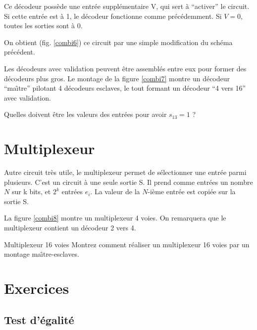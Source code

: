 Ce d\'ecodeur poss\`ede une entr\'ee suppl\'ementaire V, qui sert
à ``activer'' le circuit.  Si cette entr\'ee
est \`a 1, le d\'ecodeur fonctionne comme pr\'ec\'edemment. Si $V=0$,
toutes les sorties sont \`a 0.

On obtient (fig. \ref{combi6}) ce circuit par une simple modification du 
sch\'ema pr\'ec\'edent.



\begin{remarque}{} Les d\'ecodeurs avec validation peuvent \^etre
assembl\'es entre eux pour former des d\'ecodeurs plus gros. Le montage
de la figure \ref{combi7} montre un d\'ecodeur ``ma\^{\i}tre'' pilotant
4 d\'ecodeurs esclaves, le tout formant un d\'ecodeur ``4 vers 16''
avec validation.
\end{remarque}


\begin{exercice}{} Quelles doivent être les valeurs des entrées pour
avoir $s_{13} = 1$ ?
\end{exercice}

\section{Multiplexeur}

Autre circuit très utile, le multiplexeur permet de s\'electionner une
entr\'ee parmi plusieurs. C'est un circuit \`a une seule sortie S.  Il
prend comme entr\'ees un nombre $N$ sur k bits, et $2^k$ entr\'ees
$e_i$. La valeur de la $N$-i\`eme entr\'ee est copi\'ee sur la sortie
S.


La figure \ref{combi8} montre un multiplexeur 4 voies. On remarquera
que le multiplexeur contient  un d\'ecodeur 2 vers 4.

\begin{exercice}{Multiplexeur 16 voies} Montrez comment r\'ealiser un multiplexeur 16 voies par
un montage ma\^{\i}tre-esclaves.
\end{exercice}

\section{Exercices}

\subsection{Test d'égalité}

